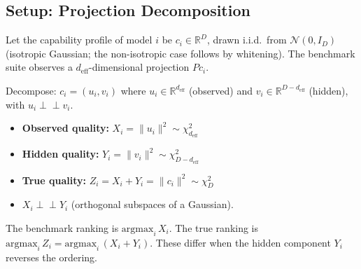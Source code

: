 

\subsection{Setup: Projection Decomposition}

Let the capability profile of model $i$ be $c_i \in \mathbb{R}^D$, drawn i.i.d.\ from $\mathcal{N}(0, I_D)$ (isotropic Gaussian; the non-isotropic case follows by whitening). The benchmark suite observes a $d_{\mathrm{eff}}$-dimensional projection $P c_i$.

Decompose: $c_i = (u_i, v_i)$ where $u_i \in \mathbb{R}^{d_{\mathrm{eff}}}$ (observed) and $v_i \in \mathbb{R}^{D - d_{\mathrm{eff}}}$ (hidden), with $u_i \perp\!\!\!\perp v_i$.

\begin{itemize}
  \item \textbf{Observed quality:} $X_i = \|u_i\|^2 \sim \chi^2_{d_{\mathrm{eff}}}$
  \item \textbf{Hidden quality:} $Y_i = \|v_i\|^2 \sim \chi^2_{D - d_{\mathrm{eff}}}$
  \item \textbf{True quality:} $Z_i = X_i + Y_i = \|c_i\|^2 \sim \chi^2_D$
  \item $X_i \perp\!\!\!\perp Y_i$ (orthogonal subspaces of a Gaussian).
\end{itemize}

The benchmark ranking is $\mathrm{argmax}_i\, X_i$. The true ranking is $\mathrm{argmax}_i\, Z_i = \mathrm{argmax}_i\, (X_i + Y_i)$. These differ when the hidden component $Y_i$ reverses the ordering.


